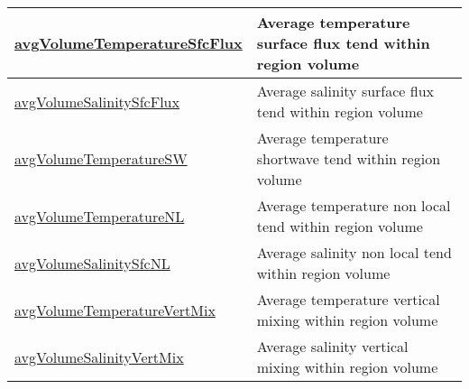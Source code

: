 {\begin{center}
\begin{longtable}{| p{2.0in} | p{4.0in} |}
    \hline
    \hyperref[subsec:var_sec_layerVolumeWeightedAverageAM_avgVolumeTemperatureSfcFlux]{avgVolumeTemperatureSfcFlux} & Average temperature surface flux tend within region volume \\
    \hline
    \hyperref[subsec:var_sec_layerVolumeWeightedAverageAM_avgVolumeSalinitySfcFlux]{avgVolumeSalinitySfcFlux} & Average salinity surface flux tend within region volume \\
    \hline
    \hyperref[subsec:var_sec_layerVolumeWeightedAverageAM_avgVolumeTemperatureSW]{avgVolumeTemperatureSW} & Average temperature shortwave tend within region volume \\
    \hline
    \hyperref[subsec:var_sec_layerVolumeWeightedAverageAM_avgVolumeTemperatureNL]{avgVolumeTemperatureNL} & Average temperature non local tend within region volume \\
    \hline
    \hyperref[subsec:var_sec_layerVolumeWeightedAverageAM_avgVolumeSalinitySfcNL]{avgVolumeSalinitySfcNL} & Average salinity non local tend within region volume \\
    \hline
    \hyperref[subsec:var_sec_layerVolumeWeightedAverageAM_avgVolumeTemperatureVertMix]{avgVolumeTemperatureVertMix} & Average temperature vertical mixing within region volume \\
    \hline
    \hyperref[subsec:var_sec_layerVolumeWeightedAverageAM_avgVolumeSalinityVertMix]{avgVolumeSalinityVertMix} & Average salinity vertical mixing within region volume \\
    \hline
\end{longtable}
\end{center}
}
